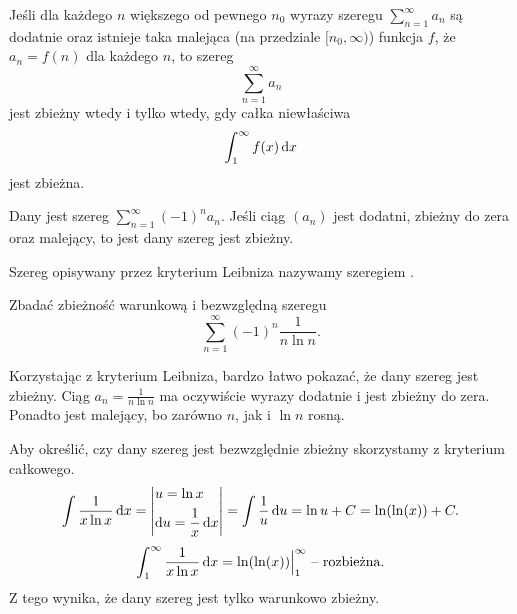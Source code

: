 \begin{theorem}
    Jeśli dla każdego $n$ większego od pewnego $n_0$ wyrazy szeregu $\sum_{n=1}^\infty a_n$ są dodatnie oraz istnieje taka malejąca (na przedziale $[n_0, \infty)$) funkcja $f$, że $a_n = f(n)$ dla każdego $n$, to szereg
    \[ \sum_{n=1}^\infty a_n \]
    jest zbieżny wtedy i tylko wtedy, gdy całka niewłaściwa
    \[ \int_1^\infty f(x) \operatorname{d}\!{x} \]
    jest zbieżna.
\end{theorem}

\begin{theorem}
    Dany jest szereg $\sum_{n=1}^\infty (-1)^na_n$. Jeśli ciąg $(a_n)$ jest dodatni, zbieżny do zera oraz malejący, to jest dany szereg jest zbieżny.
\end{theorem}

Szereg opisywany przez kryterium Leibniza nazywamy szeregiem .

\begin{example}
    Zbadać zbieżność warunkową i bezwzględną szeregu
    \[ \sum_{n=1}^\infty (-1)^n \frac{1}{n\ln{n}}. \]
\end{example}
\begin{solution}
    Korzystając z kryterium Leibniza, bardzo łatwo pokazać, że dany szereg jest zbieżny. Ciąg $a_n = \frac{1}{n\ln{n}}$ ma oczywiście wyrazy dodatnie i jest zbieżny do zera. Ponadto jest malejący, bo zarówno $n$, jak i $\ln{n}$ rosną.

    Aby określić, czy dany szereg jest bezwzględnie zbieżny skorzystamy z kryterium całkowego.
    \[ \int \frac{1}{x\ln{x}} \operatorname{d}\!{x} = \left|\begin{alignedat}{2}&u = \ln{x} \\ &\!\operatorname{d}\!{u} = \frac{1}{x} \operatorname{d}\!{x}\end{alignedat}\right| = \int \frac{1}{u} \operatorname{d}\!{u} = \ln{u} + C = \ln(\ln(x)) + C. \]
    \[ \int_1^\infty \frac{1}{x\ln{x}} \operatorname{d}\!{x} = \ln(\ln(x)) \Big|_1^\infty \text{ -- rozbieżna.} \]
    Z tego wynika, że dany szereg jest tylko warunkowo zbieżny.
\end{solution}